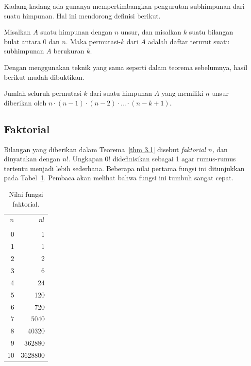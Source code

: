 Kadang-kadang ada gunanya mempertimbangkan pengurutan subhimpunan dari suatu himpunan.
Hal ini mendorong definisi berikut.
\begin{definition} Misalkan $A$ suatu himpunan dengan $n$ unsur, dan misalkan $k$
suatu bilangan bulat antara 0 dan $n$.  Maka permutasi-$k$ dari $A$ adalah daftar
terurut suatu subhimpunan $A$ berukuran $k$.
\end{definition}

Dengan menggunakan teknik yang sama seperti dalam teorema sebelumnya, hasil berikut
mudah dibuktikan.

\begin{theorem}\label{thm 3.2} Jumlah seluruh permutasi-$k$ dari suatu himpunan $A$
yang memiliki $n$ unsur diberikan oleh
$n \cdot (n-1) \cdot (n-2) \cdot \ldots \cdot (n - k + 1)$.
\end{theorem}

\subsection*{Faktorial}

Bilangan yang diberikan dalam Teorema~\ref{thm 3.1} disebut {\em faktorial $n$,}
 dan dinyatakan dengan $n!$.  Ungkapan 0! didefinisikan
sebagai 1 agar rumus-rumus tertentu menjadi lebih sederhana.  Beberapa nilai pertama
fungsi ini ditunjukkan pada Tabel~\ref{table 3.25}.  Pembaca akan melihat bahwa fungsi
ini tumbuh sangat cepat.

\begin{table}
\centering
\begin{tabular}{rr} $n$     & $n!$ \\
\\ 
0 & 1 \\
1 & 1 \\
2 & 2 \\
3 & 6 \\
4 & 24 \\
5 & 120 \\
6 & 720 \\
7 & 5040 \\
8 & 40320 \\
9 & 362880 \\
10 & 3628800 \\

\end{tabular}
\caption{Nilai fungsi faktorial.}
\label{table 3.25}
\end{table}




